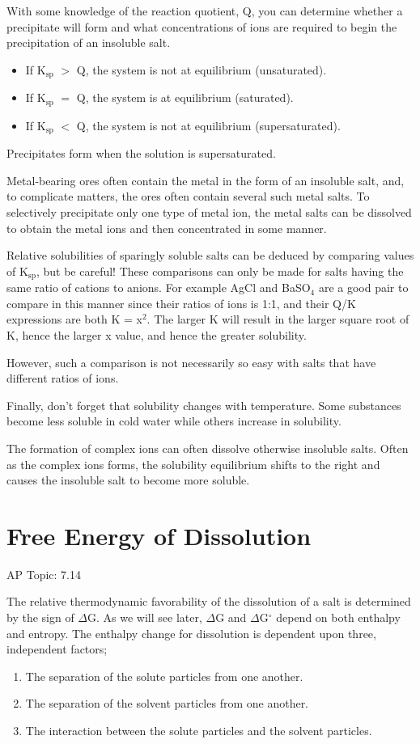 \documentclass[../chem.tex]{subfiles}
\begin{document}
With some knowledge of the reaction quotient, Q, you can determine whether a precipitate will form and what concentrations of ions are required to begin the precipitation of an insoluble salt.
\begin{itemize}
    \item If K$_{\text{sp}}$ $>$ Q, the system is not at equilibrium (unsaturated).
    \item If K$_{\text{sp}}$ $=$ Q, the system is at equilibrium (saturated).
    \item If K$_{\text{sp}}$ $<$ Q, the system is not at equilibrium (supersaturated). 
\end{itemize}

Precipitates form when the solution is supersaturated.

Metal-bearing ores often contain the metal in the form of an insoluble salt, and, to complicate matters, the ores often contain several such metal salts.
To selectively precipitate only one type of metal ion, the metal salts can be dissolved to obtain the metal ions and then concentrated in some manner.

Relative solubilities of sparingly soluble salts can be deduced by comparing values of K$_{\text{sp}}$, but be careful! These comparisons
can only be made for salts having the same ratio of cations to anions. For example AgCl and BaSO$_4$ are a good pair to compare in this manner since their ratios 
of ions is 1:1, and their Q/K expressions are both K = x$^2$. The larger K will result in the larger square root of K, hence the larger x value, and hence the greater solubility.

However, such a comparison is not necessarily so easy with salts that have different ratios of ions.

Finally, don't forget that solubility changes with temperature. Some substances become less soluble in cold water while others increase in solubility.

The formation of complex ions can often dissolve otherwise insoluble salts. Often as the complex ions forms, the solubility 
equilibrium shifts to the right and causes the insoluble salt to become more soluble. 

\section{Free Energy of Dissolution}
AP Topic: 7.14

The relative thermodynamic favorability of the dissolution of a salt is determined by the sign of $\Delta$G. As we will see later, $\Delta$G and $\Delta$G$^{\circ}$ depend on both enthalpy and entropy. 
The enthalpy change for dissolution is dependent upon three, independent factors;
\begin{enumerate}
    \item The separation of the solute particles from one another.
    \item The separation of the solvent particles from one another.
    \item The interaction between the solute particles and the solvent particles.
\end{enumerate}
\end{document}

